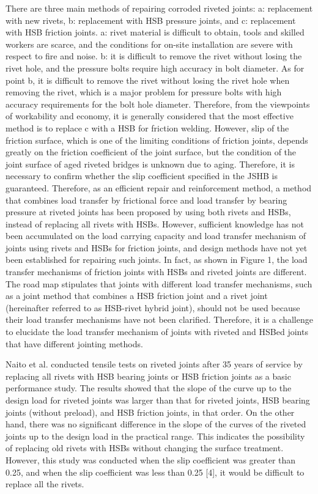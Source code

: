 There are three main methods of repairing corroded riveted joints: a: replacement with new rivets, b: replacement with \ac{HSB} pressure joints, and c: replacement with \ac{HSB} friction joints. a: rivet material is difficult to obtain, tools and skilled workers are scarce, and the conditions for on-site installation are severe with respect to fire and noise. b: it is difficult to remove the rivet without losing the rivet hole, and the pressure bolts require high accuracy in bolt diameter. As for point b, it is difficult to remove the rivet without losing the rivet hole when removing the rivet, which is a major problem for pressure bolts with high accuracy requirements for the bolt hole diameter. Therefore, from the viewpoints of workability and economy, it is generally considered that the most effective method is to replace c with a \ac{HSB} for friction welding. However, slip of the friction surface, which is one of the limiting conditions of friction joints, depends greatly on the friction coefficient of the joint surface, but the condition of the joint surface of aged riveted bridges is unknown due to aging. Therefore, it is necessary to confirm whether the slip coefficient specified in the \ac{JSHB} \cite{douji2017} is guaranteed. Therefore, as an efficient repair and reinforcement method, a method that combines load transfer by frictional force and load transfer by bearing pressure at riveted joints has been proposed by using both rivets and \ac{HSB}s, instead of replacing all rivets with \ac{HSB}s. However, sufficient knowledge has not been accumulated on the load carrying capacity and load transfer mechanism of joints using rivets and \ac{HSB}s for friction joints, and design methods have not yet been established for repairing such joints. In fact, as shown in Figure 1, the load transfer mechanisms of friction joints with \ac{HSB}s and riveted joints are different. The road map stipulates that joints with different load transfer mechanisms, such as a joint method that combines a \ac{HSB} friction joint and a rivet joint (hereinafter referred to as HSB-rivet hybrid joint), should not be used because their load transfer mechanisms have not been clarified. Therefore, it is a challenge to elucidate the load transfer mechanism of joints with riveted and \ac{HSB}ed joints that have different jointing methods.

Naito et al. \cite{naito2007basic} conducted tensile tests on riveted joints after 35 years of service by replacing all rivets with \ac{HSB} bearing joints or \ac{HSB} friction joints as a basic performance study. The results showed that the slope of the curve up to the design load for riveted joints was larger than that for riveted joints, \ac{HSB} bearing joints (without preload), and \ac{HSB} friction joints, in that order. On the other hand, there was no significant difference in the slope of the curves of the riveted joints up to the design load in the practical range. This indicates the possibility of replacing old rivets with \ac{HSB}s without changing the surface treatment. However, this study was conducted when the slip coefficient was greater than 0.25, and when the slip coefficient was less than 0.25 [4], it would be difficult to replace all the rivets.

